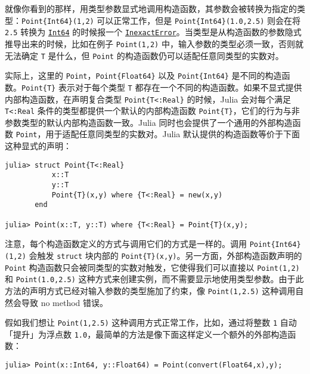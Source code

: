 就像你看到的那样，用类型参数显式地调用构造函数，其参数会被转换为指定的类型：\texttt{Point\{Int64\}(1,2)} 可以正常工作，但是 \texttt{Point\{Int64\}(1.0,2.5)} 则会在将 \texttt{2.5} 转换为 \hyperlink{7720564657383125058}{\texttt{Int64}} 的时候报一个 \hyperlink{5399118524830636312}{\texttt{InexactError}}。当类型是从构造函数的参数隐式推导出来的时候，比如在例子 \texttt{Point(1,2)} 中，输入参数的类型必须一致，否则就无法确定 \texttt{T} 是什么，但 \texttt{Point} 的构造函数仍可以适配任意同类型的实数对。



实际上，这里的 \texttt{Point}，\texttt{Point\{Float64\}} 以及 \texttt{Point\{Int64\}} 是不同的构造函数。\texttt{Point\{T\}} 表示对于每个类型 \texttt{T} 都存在一个不同的构造函数。如果不显式提供内部构造函数，在声明复合类型 \texttt{Point\{T<:Real\}} 的时候，Julia 会对每个满足 \texttt{T<:Real} 条件的类型都提供一个默认的内部构造函数 \texttt{Point\{T\}}，它们的行为与非参数类型的默认内部构造函数一致。Julia 同时也会提供了一个通用的外部构造函数 \texttt{Point}，用于适配任意同类型的实数对。Julia 默认提供的构造函数等价于下面这种显式的声明：




\begin{verbatim}
julia> struct Point{T<:Real}
           x::T
           y::T
           Point{T}(x,y) where {T<:Real} = new(x,y)
       end

julia> Point(x::T, y::T) where {T<:Real} = Point{T}(x,y);
\end{verbatim}



注意，每个构造函数定义的方式与调用它们的方式是一样的。调用 \texttt{Point\{Int64\}(1,2)} 会触发 \texttt{struct} 块内部的 \texttt{Point\{T\}(x,y)}。另一方面，外部构造函数声明的 \texttt{Point} 构造函数只会被同类型的实数对触发，它使得我们可以直接以 \texttt{Point(1,2)} 和 \texttt{Point(1.0,2.5)} 这种方式来创建实例，而不需要显示地使用类型参数。由于此方法的声明方式已经对输入参数的类型施加了约束，像 \texttt{Point(1,2.5)} 这种调用自然会导致 {\textquotedbl}no method{\textquotedbl} 错误。



假如我们想让 \texttt{Point(1,2.5)} 这种调用方式正常工作，比如，通过将整数 \texttt{1} 自动「提升」为浮点数 \texttt{1.0}，最简单的方法是像下面这样定义一个额外的外部构造函数：




\begin{verbatim}
julia> Point(x::Int64, y::Float64) = Point(convert(Float64,x),y);
\end{verbatim}



